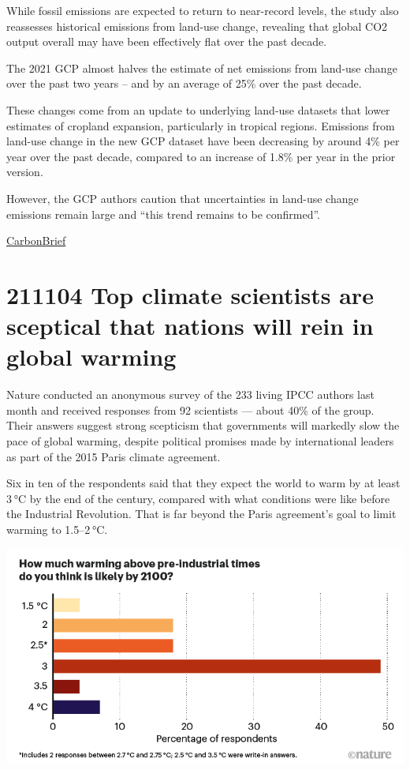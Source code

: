 \documentclass[
]{book}
\begin{document}
While fossil emissions are expected to return to near-record levels, the study also reassesses historical emissions from land-use change, revealing that global CO2 output overall may have been effectively flat over the past decade.

The 2021 GCP almost halves the estimate of net emissions from land-use change over the past two years -- and by an average of 25\% over the past decade.

These changes come from an update to underlying land-use datasets that lower estimates of cropland expansion, particularly in tropical regions. Emissions from land-use change in the new GCP dataset have been decreasing by around 4\% per year over the past decade, compared to an increase of 1.8\% per year in the prior version.

However, the GCP authors caution that uncertainties in land-use change emissions remain large and ``this trend remains to be confirmed''.

\href{https://www.carbonbrief.org/global-co2-emissions-have-been-flat-for-a-decade-new-data-reveals}{CarbonBrief}

\hypertarget{top-climate-scientists-are-sceptical-that-nations-will-rein-in-global-warming}{%
\section{211104 Top climate scientists are sceptical that nations will rein in global warming}\label{top-climate-scientists-are-sceptical-that-nations-will-rein-in-global-warming}}

Nature conducted an anonymous survey of the 233 living IPCC authors last month and received responses from 92 scientists --- about 40\% of the group. Their answers suggest strong scepticism that governments will markedly slow the pace of global warming, despite political promises made by international leaders as part of the 2015 Paris climate agreement.

Six in ten of the respondents said that they expect the world to warm by at least 3 °C by the end of the century, compared with what conditions were like before the Industrial Revolution. That is far beyond the Paris agreement's goal to limit warming to 1.5--2 °C.

\includegraphics{fig/ipcc_scientist_expected_temp_rise.png}
\end{document}
